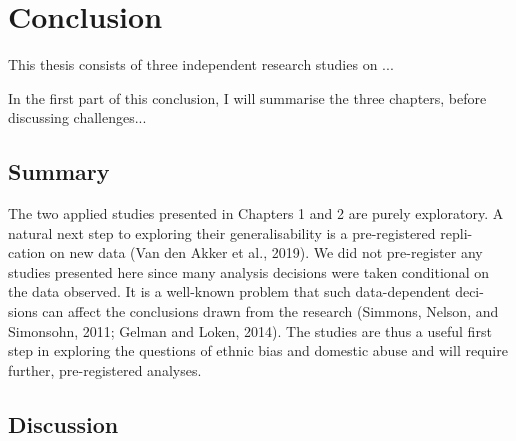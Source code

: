 
\chapter*{Conclusion}%
\label{cha:conclusion}


This thesis consists of three independent research studies on ...

In the first part of this conclusion, I will summarise the three chapters,
before discussing challenges...


\section{Summary}%
\label{sec:summary}

The two applied studies presented in Chapters 1 and 2 are purely exploratory.
A natural next step to exploring their generalisability is a pre-registered repli- cation on new data (Van den Akker et al., 2019). We did not pre-register any studies presented here since many analysis decisions were taken conditional on the data observed. It is a well-known problem that such data-dependent deci- sions can affect the conclusions drawn from the research (Simmons, Nelson, and Simonsohn, 2011; Gelman and Loken, 2014). The studies are thus a useful first step in exploring the questions of ethnic bias and domestic abuse and will require further, pre-registered analyses.




\section{Discussion}%
\label{sec:discussion}


